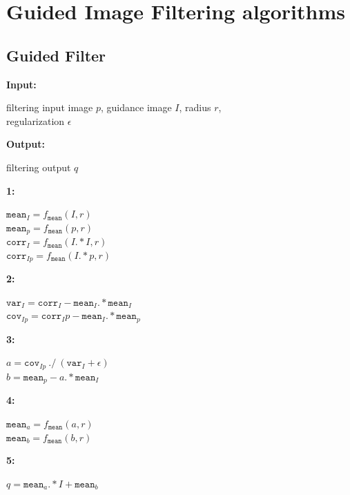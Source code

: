 \appendix

\chapter{Guided Image Filtering algorithms}
\label{ax:gif}
\section{Guided Filter}

\begin{algorithmic}
    \State \textbf{Input:} \phantom{1}\parbox[t]{\dimexpr\linewidth-\algorithmicindent-7em}{
    filtering input image $p$, guidance image $I$, radius $r$,\\
    regularization $\epsilon$
    }
    \vspace{0.1em}

    \State \textbf{Output:} \phantom{1}\parbox[t]{\dimexpr\linewidth-\algorithmicindent-7em}{
    filtering output $q$
    }
    \vspace{0.1em}
    \State \textbf{1:} \phantom{1}\parbox[t]{\dimexpr\linewidth-\algorithmicindent-1em}{
    $\texttt{mean}_I = f_\texttt{mean}(I, r)$ \\
    $\texttt{mean}_p = f_\texttt{mean}(p, r)$ \\
    $\texttt{corr}_{I} = f_\texttt{mean}(I .* I, r)$ \\
    $\texttt{corr}_{Ip} = f_\texttt{mean}(I .* p, r)$
    }
    \vspace{0.1em}
    \State \textbf{2:} \phantom{1}\parbox[t]{\dimexpr\linewidth-\algorithmicindent-1em}{
    $\texttt{var}_I = \texttt{corr}_I - \texttt{mean}_I .* \texttt{mean}_I$ \\
    $\texttt{cov}_{Ip} = \texttt{corr}_Ip - \texttt{mean}_I .* \texttt{mean}_p$
    }
    \vspace{0.1em}
    \State \textbf{3:} \phantom{1}\parbox[t]{\dimexpr\linewidth-\algorithmicindent-1em}{
    $a = \texttt{cov}_{Ip}\ ./\ (\texttt{var}_I + \epsilon)$ \\
    $b = \texttt{mean}_p - a .* \texttt{mean}_I$
    }
    \vspace{0.1em}
    \State \textbf{4:} \phantom{1}\parbox[t]{\dimexpr\linewidth-\algorithmicindent-1em}{
    $\texttt{mean}_a = f_\texttt{mean}(a, r)$ \\
    $\texttt{mean}_b = f_\texttt{mean}(b, r)$
    }
    \vspace{0.1em}
    \State \textbf{5:} \phantom{1}\parbox[t]{\dimexpr\linewidth-\algorithmicindent-1em}{
    $q = \texttt{mean}_a .* I + \texttt{mean}_b$
    }
\end{algorithmic}

